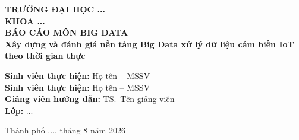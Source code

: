 \begin{titlepage}
    \centering
    \vspace*{2cm}

    {\large \textbf{TRƯỜNG ĐẠI HỌC ...}}\\[0.5cm]
    {\large \textbf{KHOA ...}}\\[2cm]

    {\Huge \textbf{BÁO CÁO MÔN BIG DATA}}\\[1cm]
    {\LARGE \textbf{Xây dựng và đánh giá nền tảng Big Data xử lý dữ liệu cảm biến IoT theo thời gian thực}}\\[2cm]

    \begin{flushleft}
        \large
        \textbf{Sinh viên thực hiện:} Họ tên -- MSSV\\[0.3cm]
        \textbf{Sinh viên thực hiện:} Họ tên -- MSSV\\[0.3cm]
        \textbf{Giảng viên hướng dẫn:} TS.\ Tên giảng viên\\[0.3cm]
        \textbf{Lớp:} ...
    \end{flushleft}

    \vfill
    {\large Thành phố ..., tháng 8 năm 2026}
\end{titlepage}
